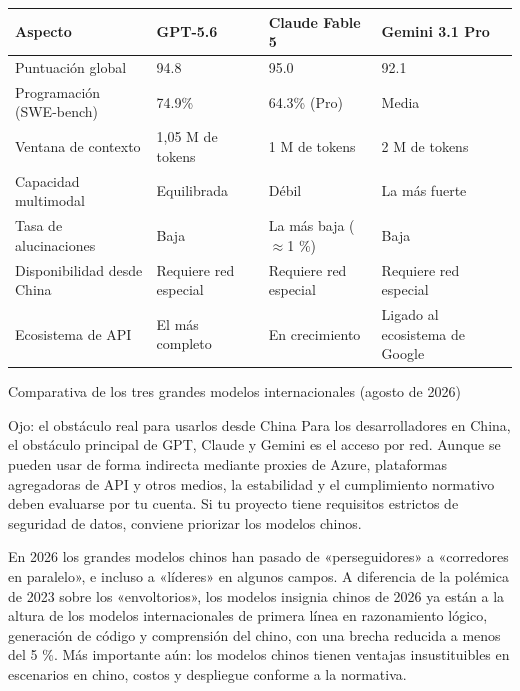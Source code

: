 \begin{center}
\begin{tabularx}{\linewidth}{|X|X|X|X|}
\hline
\textbf{Aspecto} & \textbf{GPT-5.6} & \textbf{Claude Fable 5} & \textbf{Gemini 3.1 Pro} \tabularnewline
\hline
Puntuación global & 94.8 & 95.0 & 92.1 \tabularnewline
Programación (SWE-bench) & 74.9\% & 64.3\% (Pro) & Media \tabularnewline
Ventana de contexto & 1,05 M de tokens & 1 M de tokens & 2 M de tokens \tabularnewline
Capacidad multimodal & Equilibrada & Débil & La más fuerte \tabularnewline
Tasa de alucinaciones & Baja & La más baja ($\approx$1 \%) & Baja \tabularnewline
Disponibilidad desde China & Requiere red especial & Requiere red especial & Requiere red especial \tabularnewline
Ecosistema de API & El más completo & En crecimiento & Ligado al ecosistema de Google \tabularnewline
\hline
\end{tabularx}
\end{center}

\begin{center}\small\color{gray}Comparativa de los tres grandes modelos internacionales (agosto de 2026)\end{center}

\begin{tcbwarn}{Ojo: el obstáculo real para usarlos desde China}
Para los desarrolladores en China, el obstáculo principal de GPT, Claude y Gemini es el acceso por red. Aunque se pueden usar de forma indirecta mediante proxies de Azure, plataformas agregadoras de API y otros medios, la estabilidad y el cumplimiento normativo deben evaluarse por tu cuenta. Si tu proyecto tiene requisitos estrictos de seguridad de datos, conviene priorizar los modelos chinos.

\end{tcbwarn}


En 2026 los grandes modelos chinos han pasado de «perseguidores» a «corredores en paralelo», e incluso a «líderes» en algunos campos. A diferencia de la polémica de 2023 sobre los «envoltorios», los modelos insignia chinos de 2026 ya están a la altura de los modelos internacionales de primera línea en razonamiento lógico, generación de código y comprensión del chino, con una brecha reducida a menos del 5 \%. Más importante aún: los modelos chinos tienen ventajas insustituibles en escenarios en chino, costos y despliegue conforme a la normativa.


